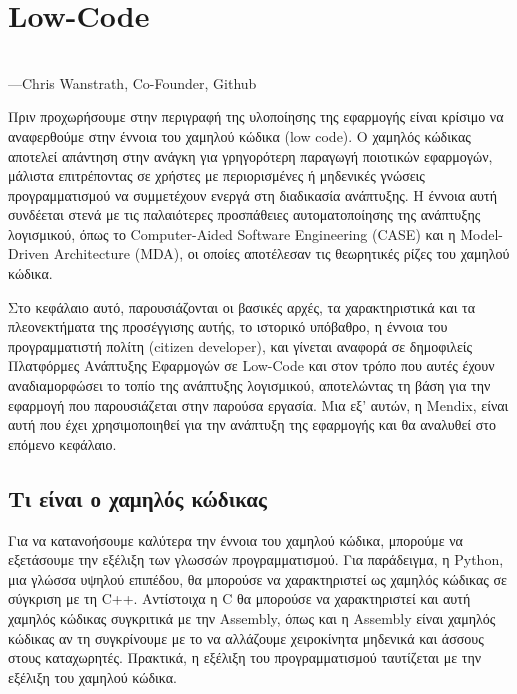 \chapter{Low-Code}
    \begin{displayquote} \centering
         \\
        \hspace*{\fill}---Chris Wanstrath, Co-Founder, Github
    \end{displayquote}
    \vspace{1em}

    Πριν προχωρήσουμε στην περιγραφή της υλοποίησης της εφαρμογής είναι κρίσιμο να αναφερθούμε στην έννοια του χαμηλού κώδικα (low code). Ο χαμηλός κώδικας αποτελεί απάντηση στην ανάγκη για γρηγορότερη παραγωγή ποιοτικών εφαρμογών, μάλιστα επιτρέποντας σε χρήστες με περιορισμένες ή μηδενικές γνώσεις προγραμματισμού να συμμετέχουν ενεργά στη διαδικασία ανάπτυξης. Η έννοια αυτή συνδέεται στενά με τις παλαιότερες προσπάθειες αυτοματοποίησης της ανάπτυξης λογισμικού, όπως το Computer-Aided Software Engineering (CASE) και η Model-Driven Architecture (MDA), οι οποίες αποτέλεσαν τις θεωρητικές ρίζες του χαμηλού κώδικα.

    Στο κεφάλαιο αυτό, παρουσιάζονται οι βασικές αρχές, τα χαρακτηριστικά και τα πλεονεκτήματα της προσέγγισης αυτής, το ιστορικό υπόβαθρο, η έννοια του προγραμματιστή πολίτη (citizen developer), και γίνεται αναφορά σε δημοφιλείς Πλατφόρμες Ανάπτυξης Εφαρμογών σε Low-Code και στον τρόπο που αυτές έχουν αναδιαμορφώσει το τοπίο της ανάπτυξης λογισμικού, αποτελώντας τη βάση για την εφαρμογή που παρουσιάζεται στην παρούσα εργασία. Μια εξ' αυτών, η Mendix, είναι αυτή που έχει χρησιμοποιηθεί για την ανάπτυξη της εφαρμογής και θα αναλυθεί στο επόμενο κεφάλαιο.


    \section{Τι είναι ο χαμηλός κώδικας}
        \begin{displayquote} \justifying
             \cite{Ibm_2024}
        \end{displayquote}

        Για να κατανοήσουμε καλύτερα την έννοια του χαμηλού κώδικα, μπορούμε να εξετάσουμε την εξέλιξη των γλωσσών προγραμματισμού. Για παράδειγμα, η Python, μια γλώσσα υψηλού επιπέδου, θα μπορούσε να χαρακτηριστεί ως χαμηλός κώδικας σε σύγκριση με τη C++. Αντίστοιχα η C θα μπορούσε να χαρακτηριστεί και αυτή χαμηλός κώδικας συγκριτικά με την Assembly, όπως και η Assembly είναι χαμηλός κώδικας αν τη συγκρίνουμε με το να αλλάζουμε χειροκίνητα μηδενικά και άσσους στους καταχωρητές. Πρακτικά, η εξέλιξη του προγραμματισμού ταυτίζεται με την εξέλιξη του χαμηλού κώδικα.

